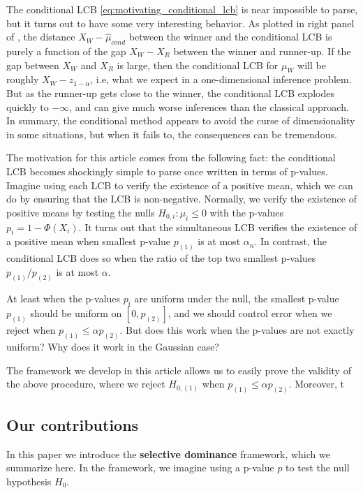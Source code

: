 \documentclass{article}
\begin{document}
The conditional LCB \eqref{eq:motivating_conditional_lcb} is near impossible to parse, but it turns out to have some very interesting behavior. As plotted in right panel of , the distance $X_W - \hat{\mu}_{cond}$ between the winner and the conditional LCB is purely a function of the gap $X_W - X_R$ between the winner and runner-up. If the gap between $X_W$ and $X_R$ is large, then the conditional LCB for $\mu_W$ will be roughly $X_{W} - z_{1-\alpha}$, i.e, what we expect in a one-dimensional inference problem. But as the runner-up gets close to the winner, the conditional LCB explodes quickly to $-\infty$, and can give much worse inferences than the classical approach. In summary, the conditional method appears to avoid the curse of dimensionality in some situations, but when it fails to, the consequences can be tremendous. 

The motivation for this article comes from the following fact: the conditional LCB becomes shockingly simple to parse once written in terms of p-values. Imagine using each LCB to verify the existence of a positive mean, which we can do by ensuring that the LCB is non-negative. Normally, we verify the existence of positive means by testing the nulls $H_{0, i} : \mu_i \leq 0$ with the p-values $p_i = 1 - \Phi(X_i)$. It turns out that the simultaneous LCB verifies the existence of a positive mean when smallest p-value $p_{(1)}$ is at most $\alpha_n$. In contrast, the conditional LCB does so when the ratio of the top two smallest p-values $p_{(1)}/p_{(2)}$ is at most $\alpha$. 


At least when the p-values $p_i$ are uniform under the null, the smallest p-value $p_{(1)}$ should be uniform on $[0, p_{(2)}]$, and we should control error when we reject when $p_{(1)} \leq \alpha p_{(2)}$. But does this work when the p-values are not exactly uniform? Why does it work in the Gaussian case?

The framework we develop in this article allows us to easily prove the validity of the above procedure, where we reject $H_{0, (1)}$ when $p_{(1)} \leq \alpha p_{(2)}$. Moreover, t



\subsection{Our contributions}

In this paper we introduce the \textbf{selective dominance} framework, which we summarize here. In the framework, we imagine using a p-value $p$ to test the null hypothesis $H_0$. 
\end{document}
